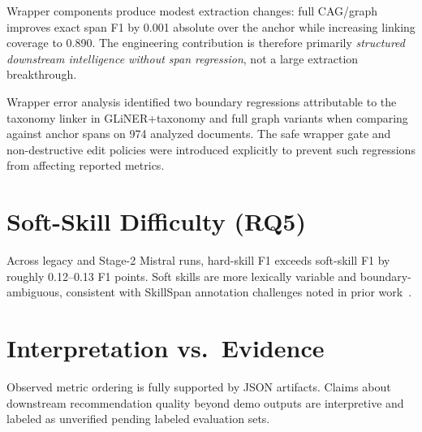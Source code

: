 Wrapper components produce modest extraction changes: full CAG/graph improves exact span F1 by 0.001 absolute over the anchor while increasing linking coverage to 0.890.
The engineering contribution is therefore primarily \emph{structured downstream intelligence without span regression}, not a large extraction breakthrough.

Wrapper error analysis identified two boundary regressions attributable to the taxonomy linker in GLiNER+taxonomy and full graph variants when comparing against anchor spans on 974 analyzed documents.
The safe wrapper gate and non-destructive edit policies were introduced explicitly to prevent such regressions from affecting reported metrics.

\section{Soft-Skill Difficulty (RQ5)}

Across legacy and Stage-2 Mistral runs, hard-skill F1 exceeds soft-skill F1 by roughly 0.12--0.13 F1 points.
Soft skills are more lexically variable and boundary-ambiguous, consistent with SkillSpan annotation challenges noted in prior work~\cite{zhang2022skillspan}.

\section{Interpretation vs.\ Evidence}

Observed metric ordering is fully supported by JSON artifacts.
Claims about downstream recommendation quality beyond demo outputs are interpretive and labeled as unverified pending labeled evaluation sets.
